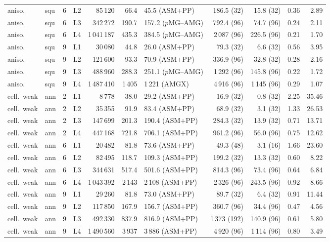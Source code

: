 \begin{tabular}{llrrrrlrrrr}
aniso. & squ & 6 & L2 & 85\,120 & 66.4 & 45.5 (ASM+PP) & 186.5 (32) & 15.8 (32) & 0.36 & 2.89\\
aniso. & squ & 6 & L3 & 342\,272 & 190.7 & 157.2 ($p$MG--AMG) & 792.4 (96) & 74.7 (96) & 0.24 & 2.11\\
aniso. & squ & 6 & L4 & 1\,041\,187 & 435.3 & 384.5 ($p$MG--AMG) & 2\,087 (96) & 226.5 (96) & 0.21 & 1.70\\
aniso. & squ & 9 & L1 & 30\,080 & 44.8 & 26.0 (ASM+PP) & 79.3 (32) & 6.6 (32) & 0.56 & 3.95\\
aniso. & squ & 9 & L2 & 121\,600 & 93.3 & 70.9 (ASM+PP) & 336.9 (96) & 32.8 (32) & 0.28 & 2.16\\
aniso. & squ & 9 & L3 & 488\,960 & 288.3 & 251.1 ($p$MG--AMG) & 1\,292 (96) & 145.8 (96) & 0.22 & 1.72\\
aniso. & squ & 9 & L4 & 1\,487\,410 & 1\,405 & 1\,221 (AMGX) & 4\,916 (96) & 1\,145 (96) & 0.29 & 1.07\\
cell.\ weak & ann & 2 & L1 & 8\,778 & 38.0 & 29.2 (ASM+PP) & 16.9 (32) & 0.8 (32) & 2.25 & 35.46\\
cell.\ weak & ann & 2 & L2 & 35\,355 & 91.9 & 83.4 (ASM+PP) & 68.9 (32) & 3.1 (32) & 1.33 & 26.53\\
cell.\ weak & ann & 2 & L3 & 147\,699 & 201.3 & 190.4 (ASM+PP) & 284.3 (32) & 13.9 (32) & 0.71 & 13.71\\
cell.\ weak & ann & 2 & L4 & 447\,168 & 721.8 & 706.1 (ASM+PP) & 961.2 (96) & 56.0 (96) & 0.75 & 12.62\\
cell.\ weak & ann & 6 & L1 & 20\,482 & 81.8 & 73.6 (ASM+PP) & 49.3 (48) & 3.1 (16) & 1.66 & 23.60\\
cell.\ weak & ann & 6 & L2 & 82\,495 & 118.7 & 109.3 (ASM+PP) & 199.2 (32) & 13.3 (32) & 0.60 & 8.22\\
cell.\ weak & ann & 6 & L3 & 344\,631 & 517.4 & 501.6 (ASM+PP) & 814.3 (96) & 73.4 (96) & 0.64 & 6.84\\
cell.\ weak & ann & 6 & L4 & 1\,043\,392 & 2\,143 & 2\,108 (ASM+PP) & 2\,326 (96) & 243.5 (96) & 0.92 & 8.66\\
cell.\ weak & ann & 9 & L1 & 29\,260 & 81.8 & 73.0 (ASM+PP) & 89.7 (32) & 6.4 (32) & 0.91 & 11.44\\
cell.\ weak & ann & 9 & L2 & 117\,850 & 167.9 & 156.7 (ASM+PP) & 360.7 (96) & 34.4 (96) & 0.47 & 4.56\\
cell.\ weak & ann & 9 & L3 & 492\,330 & 837.9 & 816.9 (ASM+PP) & 1\,373 (192) & 140.9 (96) & 0.61 & 5.80\\
cell.\ weak & ann & 9 & L4 & 1\,490\,560 & 3\,937 & 3\,886 (ASM+PP) & 4\,920 (96) & 1\,114 (96) & 0.80 & 3.49\\

\end{tabular}
